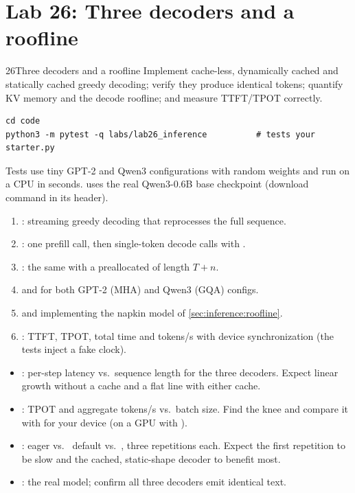 \section{Lab 26: Three decoders and a roofline}\label{sec:inference:lab}
\begin{labbox}{26}{Three decoders and a roofline}
Implement cache-less, dynamically cached and statically cached greedy decoding; verify they produce
identical tokens; quantify KV memory and the decode roofline; and measure TTFT/TPOT correctly.

\begin{lstlisting}[style=shell]
cd code
python3 -m pytest -q labs/lab26_inference          # tests your starter.py
\end{lstlisting}
Tests use tiny GPT-2 and Qwen3 configurations with random weights and run on a CPU in seconds.
 uses the real Qwen3-0.6B base checkpoint (download command in its header).

\begin{enumerate}
  \item {}: streaming greedy decoding that reprocesses the full sequence.
  \item {}: one prefill call, then single-token decode calls with .
  \item {}: the same with a preallocated  of length $T+n$.
  \item {} and  for both GPT-2 (MHA) and Qwen3 (GQA) configs.
  \item {} and  implementing the napkin model of \cref{sec:inference:roofline}.
  \item {}: TTFT, TPOT, total time and tokens/s with device synchronization
    (the tests inject a fake clock).
\end{enumerate}

\begin{itemize}
  \item {}: per-step latency vs.\ sequence length for the
    three decoders. Expect linear growth without a cache and a flat line with either cache.
  \item {}: TPOT and aggregate tokens/s vs.\ batch size. Find the knee and
    compare it with  for your device (on a GPU with ).
  \item {}: eager vs.\  default vs.\
    , three repetitions each. Expect the first repetition to be slow and the
    cached, static-shape decoder to benefit most.
  \item {}: the real model; confirm all three decoders emit identical text.
\end{itemize}


\end{labbox}

